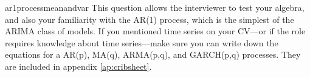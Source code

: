 \begin{answer}{ar1processmeanandvar}
This question allows the interviewer to test your algebra, and also your familiarity with the AR(1) process, which is the simplest of the ARIMA class of models.
If you mentioned time series on your CV---or if the role requires knowledge about time series---make
sure you can write down the equations for a AR(p),  MA(q), ARMA(p,q), and GARCH(p,q) processes.
They are included in appendix \ref{ap:cribsheet}.
\end{answer}
